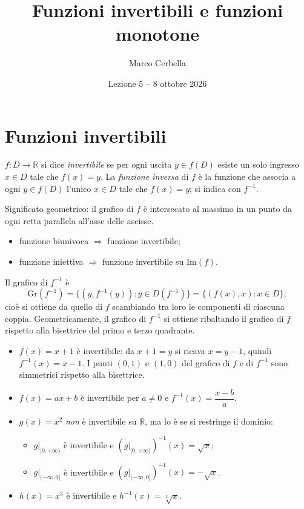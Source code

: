 \documentclass[11pt,a4paper]{article}
\title{Funzioni invertibili e funzioni monotone}
\author{Marco Cerbella}
\date{Lezione 5 -- 8 ottobre 2026}
\begin{document}
\maketitle

\section{Funzioni invertibili}

\begin{definizione}
$f : D \to \mathbb{R}$ si dice \emph{invertibile} se per ogni uscita $y \in f(D)$ esiste un solo ingresso $x \in D$ tale che $f(x) = y$. La \emph{funzione inversa} di $f$ è la funzione che associa a ogni $y \in f(D)$ l'unico $x \in D$ tale che $f(x) = y$; si indica con $f^{-1}$.
\end{definizione}

Significato geometrico: il grafico di $f$ è intersecato al massimo in un punto da ogni retta parallela all'asse delle ascisse.

\begin{itemize}
    \item funzione biunivoca $\Rightarrow$ funzione invertibile;
    \item funzione iniettiva $\Rightarrow$ funzione invertibile su $\mathrm{Im}(f)$.
\end{itemize}

Il grafico di $f^{-1}$ è
\[
\mathrm{Gr}(f^{-1}) = \{(y, f^{-1}(y)) : y \in D(f^{-1})\} = \{(f(x), x) : x \in D\},
\]
cioè si ottiene da quello di $f$ scambiando tra loro le componenti di ciascuna coppia. Geometricamente, il grafico di $f^{-1}$ si ottiene ribaltando il grafico di $f$ rispetto alla bisettrice del primo e terzo quadrante.

\begin{esempio}
\leavevmode
\begin{itemize}
    \item $f(x) = x + 1$ è invertibile: da $x + 1 = y$ si ricava $x = y - 1$, quindi $f^{-1}(x) = x - 1$. I punti $(0,1)$ e $(1,0)$ del grafico di $f$ e di $f^{-1}$ sono simmetrici rispetto alla bisettrice.
    \item $f(x) = ax + b$ è invertibile per $a \neq 0$ e $f^{-1}(x) = \dfrac{x - b}{a}$.
    \item $g(x) = x^2$ \emph{non} è invertibile su $\mathbb{R}$, ma lo è se si restringe il dominio:
    \begin{itemize}
        \item $g|_{[0,+\infty)}$ è invertibile e $(g|_{[0,+\infty)})^{-1}(x) = \sqrt{x}$;
        \item $g|_{(-\infty,0]}$ è invertibile e $(g|_{(-\infty,0]})^{-1}(x) = -\sqrt{x}$.
    \end{itemize}
    \item $h(x) = x^3$ è invertibile e $h^{-1}(x) = \sqrt[3]{x}$.
\end{itemize}
\end{esempio}
\end{document}
